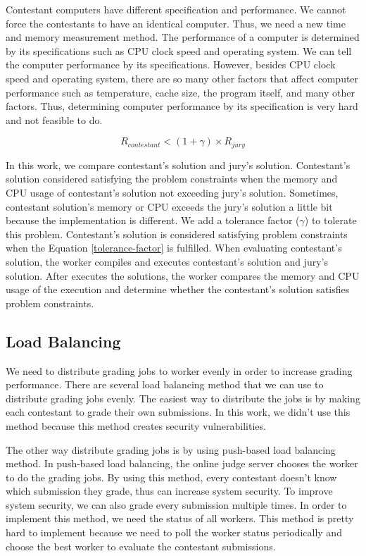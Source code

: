 \documentclass[conference]{IEEEtran}
\begin{document}
Contestant computers have different specification and performance. We cannot force the contestants to have an identical computer. Thus, we need a new time and memory measurement method. The performance of a computer is determined by its specifications such as CPU clock speed and operating system. We can tell the computer performance by its specifications. However, besides CPU clock speed and operating system, there are so many other factors that affect computer performance such as temperature, cache size, the program itself, and many other factors. Thus, determining computer performance by its specification is very hard and not feasible to do.

\begin{equation}\label{tolerance-factor}
R_{contestant} < (1 + \gamma) \times R_{jury}
\end{equation}

In this work, we compare contestant's solution and jury's solution. Contestant's solution considered satisfying the problem constraints when the memory and CPU usage of contestant's solution not exceeding jury's solution. Sometimes, contestant solution's memory or CPU exceeds the jury's solution a little bit because the implementation is different. We add a tolerance factor ($\gamma$) to tolerate this problem. Contestant's solution is considered satisfying problem constraints when the Equation \ref{tolerance-factor} is fulfilled. When evaluating contestant's solution, the worker compiles and executes contestant's solution and jury's solution. After executes the solutions, the worker compares the memory and CPU usage of the execution and determine whether the contestant's solution satisfies problem constraints. 

\subsection{Load Balancing}

We need to distribute grading jobs to worker evenly in order to increase grading performance. There are several load balancing method that we can use to distribute grading jobs evenly. The easiest way to distribute the jobs is by making each contestant to grade their own submissions. In this work, we didn't use this method because this method creates security vulnerabilities.

The other way distribute grading jobs is by using push-based load balancing method. In push-based load balancing, the online judge server chooses the worker to do the grading jobs. By using this method, every contestant doesn't know which submission they grade, thus can increase system security. To improve system security, we can also grade every submission multiple times. In order to implement this method, we need the status of all workers. This method is pretty hard to implement because we need to poll the worker status periodically and choose the best worker to evaluate the contestant submissions.
\end{document}
